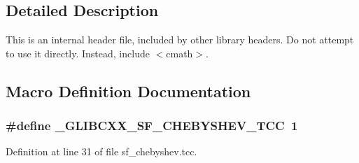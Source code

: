 \subsection{Detailed Description}
This is an internal header file, included by other library headers. Do not attempt to use it directly. Instead, include $<$cmath$>$. 

\subsection{Macro Definition Documentation}
\hypertarget{sf__chebyshev_8tcc_a4a6b0a9b7599b04e1e7316ab679fa7f5}{}
\subsubsection[{\+\_\+\+G\+L\+I\+B\+C\+X\+X\+\_\+\+S\+F\+\_\+\+C\+H\+E\+B\+Y\+S\+H\+E\+V\+\_\+\+T\+C\+C}]{\setlength{\rightskip}{0pt plus 5cm}\#define \+\_\+\+G\+L\+I\+B\+C\+X\+X\+\_\+\+S\+F\+\_\+\+C\+H\+E\+B\+Y\+S\+H\+E\+V\+\_\+\+T\+C\+C~1}\label{sf__chebyshev_8tcc_a4a6b0a9b7599b04e1e7316ab679fa7f5}


Definition at line 31 of file sf\+\_\+chebyshev.\+tcc.

